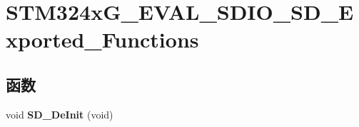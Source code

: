 \hypertarget{group___s_t_m324x_g___e_v_a_l___s_d_i_o___s_d___exported___functions}{}\section{S\+T\+M324x\+G\+\_\+\+E\+V\+A\+L\+\_\+\+S\+D\+I\+O\+\_\+\+S\+D\+\_\+\+Exported\+\_\+\+Functions}
\label{group___s_t_m324x_g___e_v_a_l___s_d_i_o___s_d___exported___functions}
\subsection*{函数}
\begin{DoxyCompactItemize}
\item 
void {\bfseries S\+D\+\_\+\+De\+Init} (void)\hypertarget{group___s_t_m324x_g___e_v_a_l___s_d_i_o___s_d___exported___functions_gad469cc842f03b1d49e08e91b515b7ded}{}\label{group___s_t_m324x_g___e_v_a_l___s_d_i_o___s_d___exported___functions_gad469cc842f03b1d49e08e91b515b7ded}


\end{DoxyCompactItemize}
